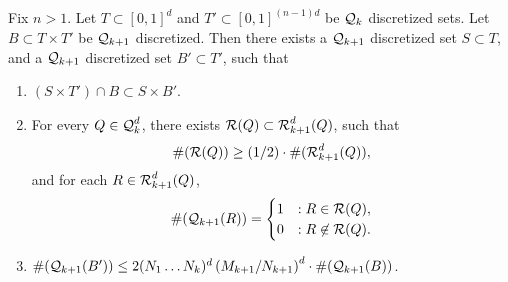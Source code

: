 \begin{lemma} \label{Lemma315091513}
    Fix $n > 1$. Let $T \subset [0,1]^d$ and $T' \subset [0,1]^{(n-1)d}$ be $\operatorname{\mathcal{Q}}_k$ discretized sets. Let $B \subset T \times T'$ be $\operatorname{\mathcal{Q}}_{k+1}$ discretized. Then there exists a $\operatorname{\mathcal{Q}}_{k+1}$ discretized set $S \subset T$, and a $\operatorname{\mathcal{Q}}_{k+1}$ discretized set $B' \subset T'$, such that
    \begin{enumerate}
        \item \label{dimensionReductionProperty} $(S \times T') \cap B \subset S \times B'$.

        \item \label{bigProperty} For every $Q \in \operatorname{\mathcal{Q}}_k^d$, there exists $\mathcal{R}(Q) \subset \operatorname{\mathcal{R}}_{k+1}^d(Q)$, such that
        \[ \#(\mathcal{R}(Q)) \geq (1/2) \cdot \#(\operatorname{\mathcal{R}}_{k+1}^d(Q)), \]
        and for each $R \in \operatorname{\mathcal{R}}_{k+1}^d(Q)$,
        \[ \#(\operatorname{\mathcal{Q}}_{k+1}(R)) = \begin{cases} 1 &: R \in \mathcal{R}(Q), \\ 0 &: R \not \in \mathcal{R}(Q). \end{cases} \]

        \item \label{BBoundProperty} $\#(\operatorname{\mathcal{Q}}_{k+1}(B')) \leq 2 (N_1 \dots N_k)^d \left( M_{k+1}/N_{k+1} \right)^d \cdot \#(\operatorname{\mathcal{Q}}_{k+1}(B))$.
    \end{enumerate}
\end{lemma}
